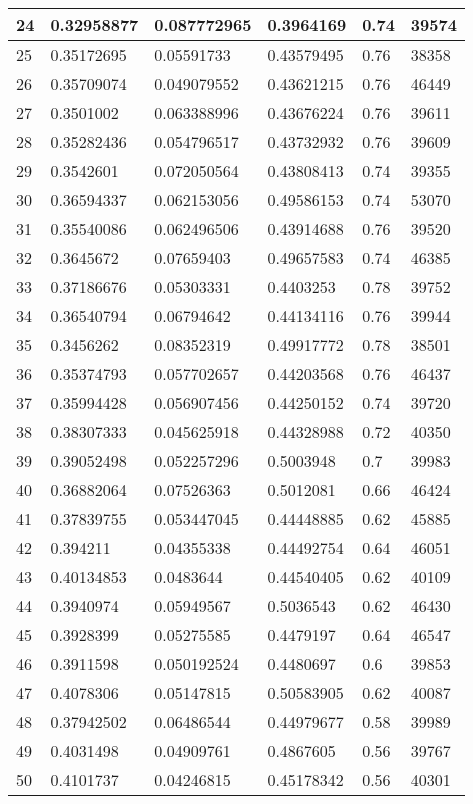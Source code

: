 \begin{longtable}{|l|l|l|l|l|l|}
24 & 0.32958877 & 0.087772965 & 0.3964169 & 0.74 & 39574 \\ \hline 
25 & 0.35172695 & 0.05591733 & 0.43579495 & 0.76 & 38358 \\ \hline 
26 & 0.35709074 & 0.049079552 & 0.43621215 & 0.76 & 46449 \\ \hline 
27 & 0.3501002 & 0.063388996 & 0.43676224 & 0.76 & 39611 \\ \hline 
28 & 0.35282436 & 0.054796517 & 0.43732932 & 0.76 & 39609 \\ \hline 
29 & 0.3542601 & 0.072050564 & 0.43808413 & 0.74 & 39355 \\ \hline 
30 & 0.36594337 & 0.062153056 & 0.49586153 & 0.74 & 53070 \\ \hline 
31 & 0.35540086 & 0.062496506 & 0.43914688 & 0.76 & 39520 \\ \hline 
32 & 0.3645672 & 0.07659403 & 0.49657583 & 0.74 & 46385 \\ \hline 
33 & 0.37186676 & 0.05303331 & 0.4403253 & 0.78 & 39752 \\ \hline 
34 & 0.36540794 & 0.06794642 & 0.44134116 & 0.76 & 39944 \\ \hline 
35 & 0.3456262 & 0.08352319 & 0.49917772 & 0.78 & 38501 \\ \hline 
36 & 0.35374793 & 0.057702657 & 0.44203568 & 0.76 & 46437 \\ \hline 
37 & 0.35994428 & 0.056907456 & 0.44250152 & 0.74 & 39720 \\ \hline 
38 & 0.38307333 & 0.045625918 & 0.44328988 & 0.72 & 40350 \\ \hline 
39 & 0.39052498 & 0.052257296 & 0.5003948 & 0.7 & 39983 \\ \hline 
40 & 0.36882064 & 0.07526363 & 0.5012081 & 0.66 & 46424 \\ \hline 
41 & 0.37839755 & 0.053447045 & 0.44448885 & 0.62 & 45885 \\ \hline 
42 & 0.394211 & 0.04355338 & 0.44492754 & 0.64 & 46051 \\ \hline 
43 & 0.40134853 & 0.0483644 & 0.44540405 & 0.62 & 40109 \\ \hline 
44 & 0.3940974 & 0.05949567 & 0.5036543 & 0.62 & 46430 \\ \hline 
45 & 0.3928399 & 0.05275585 & 0.4479197 & 0.64 & 46547 \\ \hline 
46 & 0.3911598 & 0.050192524 & 0.4480697 & 0.6 & 39853 \\ \hline 
47 & 0.4078306 & 0.05147815 & 0.50583905 & 0.62 & 40087 \\ \hline 
48 & 0.37942502 & 0.06486544 & 0.44979677 & 0.58 & 39989 \\ \hline 
49 & 0.4031498 & 0.04909761 & 0.4867605 & 0.56 & 39767 \\ \hline 
50 & 0.4101737 & 0.04246815 & 0.45178342 & 0.56 & 40301 \\ \hline 
\end{longtable}